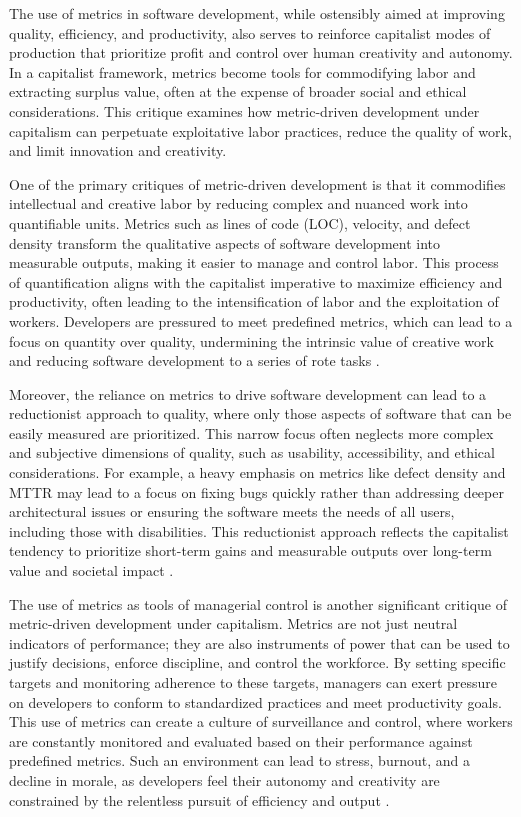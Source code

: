 \begin{refsection}
The use of metrics in software development, while ostensibly aimed at improving quality, efficiency, and productivity, also serves to reinforce capitalist modes of production that prioritize profit and control over human creativity and autonomy. In a capitalist framework, metrics become tools for commodifying labor and extracting surplus value, often at the expense of broader social and ethical considerations. This critique examines how metric-driven development under capitalism can perpetuate exploitative labor practices, reduce the quality of work, and limit innovation and creativity.

One of the primary critiques of metric-driven development is that it commodifies intellectual and creative labor by reducing complex and nuanced work into quantifiable units. Metrics such as lines of code (LOC), velocity, and defect density transform the qualitative aspects of software development into measurable outputs, making it easier to manage and control labor. This process of quantification aligns with the capitalist imperative to maximize efficiency and productivity, often leading to the intensification of labor and the exploitation of workers. Developers are pressured to meet predefined metrics, which can lead to a focus on quantity over quality, undermining the intrinsic value of creative work and reducing software development to a series of rote tasks \cite[pp.~302-305]{Marx2008Capital}.

Moreover, the reliance on metrics to drive software development can lead to a reductionist approach to quality, where only those aspects of software that can be easily measured are prioritized. This narrow focus often neglects more complex and subjective dimensions of quality, such as usability, accessibility, and ethical considerations. For example, a heavy emphasis on metrics like defect density and MTTR may lead to a focus on fixing bugs quickly rather than addressing deeper architectural issues or ensuring the software meets the needs of all users, including those with disabilities. This reductionist approach reflects the capitalist tendency to prioritize short-term gains and measurable outputs over long-term value and societal impact \cite[pp.~120-123]{Edwards1980ContestedTerrain}.

The use of metrics as tools of managerial control is another significant critique of metric-driven development under capitalism. Metrics are not just neutral indicators of performance; they are also instruments of power that can be used to justify decisions, enforce discipline, and control the workforce. By setting specific targets and monitoring adherence to these targets, managers can exert pressure on developers to conform to standardized practices and meet productivity goals. This use of metrics can create a culture of surveillance and control, where workers are constantly monitored and evaluated based on their performance against predefined metrics. Such an environment can lead to stress, burnout, and a decline in morale, as developers feel their autonomy and creativity are constrained by the relentless pursuit of efficiency and output \cite[pp.~55-57]{Taylor2009ScientificManagement}.


\end{refsection}
